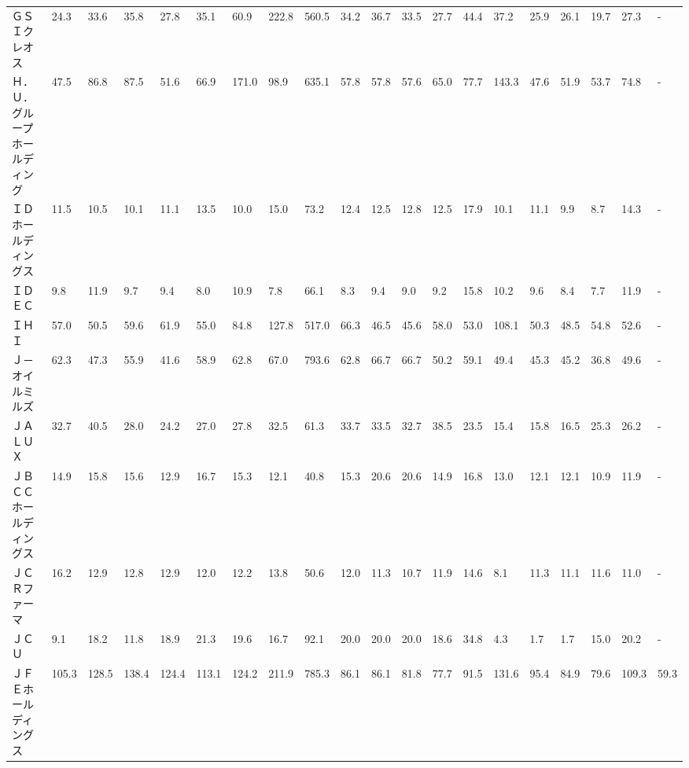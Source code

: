 \begin{longtable}[c]{lp{3mm}p{3mm}p{3mm}p{3mm}p{3mm}p{3mm}p{3mm}p{3mm}p{3mm}p{3mm}p{3mm}p{3mm}p{3mm}p{3mm}p{3mm}p{3mm}p{3mm}p{3mm}p{3mm}}
ＧＳＩクレオス         &   24.3 &   33.6 &      35.8 &      27.8 &       35.1 &    60.9 &   222.8 &    560.5 &    34.2 &    36.7 &   33.5 &   27.7 &    44.4 &    37.2 &    25.9 &   26.1 &   19.7 &    27.3 &      - \\
Ｈ．Ｕ．グループホールディング &   47.5 &   86.8 &      87.5 &      51.6 &       66.9 &   171.0 &    98.9 &    635.1 &    57.8 &    57.8 &   57.6 &   65.0 &    77.7 &   143.3 &    47.6 &   51.9 &   53.7 &    74.8 &      - \\
ＩＤホールディングス      &   11.5 &   10.5 &      10.1 &      11.1 &       13.5 &    10.0 &    15.0 &     73.2 &    12.4 &    12.5 &   12.8 &   12.5 &    17.9 &    10.1 &    11.1 &    9.9 &    8.7 &    14.3 &      - \\
ＩＤＥＣ            &    9.8 &   11.9 &       9.7 &       9.4 &        8.0 &    10.9 &     7.8 &     66.1 &     8.3 &     9.4 &    9.0 &    9.2 &    15.8 &    10.2 &     9.6 &    8.4 &    7.7 &    11.9 &      - \\
ＩＨＩ             &   57.0 &   50.5 &      59.6 &      61.9 &       55.0 &    84.8 &   127.8 &    517.0 &    66.3 &    46.5 &   45.6 &   58.0 &    53.0 &   108.1 &    50.3 &   48.5 &   54.8 &    52.6 &      - \\
Ｊ－オイルミルズ        &   62.3 &   47.3 &      55.9 &      41.6 &       58.9 &    62.8 &    67.0 &    793.6 &    62.8 &    66.7 &   66.7 &   50.2 &    59.1 &    49.4 &    45.3 &   45.2 &   36.8 &    49.6 &      - \\
ＪＡＬＵＸ           &   32.7 &   40.5 &      28.0 &      24.2 &       27.0 &    27.8 &    32.5 &     61.3 &    33.7 &    33.5 &   32.7 &   38.5 &    23.5 &    15.4 &    15.8 &   16.5 &   25.3 &    26.2 &      - \\
ＪＢＣＣホールディングス    &   14.9 &   15.8 &      15.6 &      12.9 &       16.7 &    15.3 &    12.1 &     40.8 &    15.3 &    20.6 &   20.6 &   14.9 &    16.8 &    13.0 &    12.1 &   12.1 &   10.9 &    11.9 &      - \\
ＪＣＲファーマ         &   16.2 &   12.9 &      12.8 &      12.9 &       12.0 &    12.2 &    13.8 &     50.6 &    12.0 &    11.3 &   10.7 &   11.9 &    14.6 &     8.1 &    11.3 &   11.1 &   11.6 &    11.0 &      - \\
ＪＣＵ             &    9.1 &   18.2 &      11.8 &      18.9 &       21.3 &    19.6 &    16.7 &     92.1 &    20.0 &    20.0 &   20.0 &   18.6 &    34.8 &     4.3 &     1.7 &    1.7 &   15.0 &    20.2 &      - \\
ＪＦＥホールディングス     &  105.3 &  128.5 &     138.4 &     124.4 &      113.1 &   124.2 &   211.9 &    785.3 &    86.1 &    86.1 &   81.8 &   77.7 &    91.5 &   131.6 &    95.4 &   84.9 &   79.6 &   109.3 &   59.3 \\

\end{longtable}
